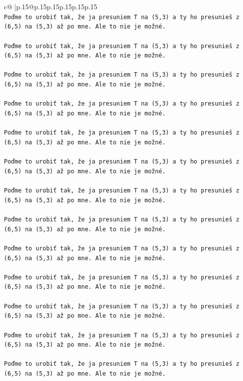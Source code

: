 \documentclass{article}
\begin{document}
{\begin{supertabular}{c@{$\;$}|p{.15\linewidth}@{}p{.15\linewidth}p{.15\linewidth}p{.15\linewidth}p{.15\linewidth}p{.15\linewidth}}
{{{\\ 
\texttt{Poďme to urobiť tak, že ja presuniem T na (5,3) a ty ho presunieš z (6,5) na (5,3) až po mne. Ale to nie je možné.} \\
\\ 
\texttt{Poďme to urobiť tak, že ja presuniem T na (5,3) a ty ho presunieš z (6,5) na (5,3) až po mne. Ale to nie je možné.} \\
\\ 
\texttt{Poďme to urobiť tak, že ja presuniem T na (5,3) a ty ho presunieš z (6,5) na (5,3) až po mne. Ale to nie je možné.} \\
\\ 
\texttt{Poďme to urobiť tak, že ja presuniem T na (5,3) a ty ho presunieš z (6,5) na (5,3) až po mne. Ale to nie je možné.} \\
\\ 
\texttt{Poďme to urobiť tak, že ja presuniem T na (5,3) a ty ho presunieš z (6,5) na (5,3) až po mne. Ale to nie je možné.} \\
\\ 
\texttt{Poďme to urobiť tak, že ja presuniem T na (5,3) a ty ho presunieš z (6,5) na (5,3) až po mne. Ale to nie je možné.} \\
\\ 
\texttt{Poďme to urobiť tak, že ja presuniem T na (5,3) a ty ho presunieš z (6,5) na (5,3) až po mne. Ale to nie je možné.} \\
\\ 
\texttt{Poďme to urobiť tak, že ja presuniem T na (5,3) a ty ho presunieš z (6,5) na (5,3) až po mne. Ale to nie je možné.} \\
\\ 
\texttt{Poďme to urobiť tak, že ja presuniem T na (5,3) a ty ho presunieš z (6,5) na (5,3) až po mne. Ale to nie je možné.} \\
\\ 
\texttt{Poďme to urobiť tak, že ja presuniem T na (5,3) a ty ho presunieš z (6,5) na (5,3) až po mne. Ale to nie je možné.} \\
\\ 
\texttt{Poďme to urobiť tak, že ja presuniem T na (5,3) a ty ho presunieš z (6,5) na (5,3) až po mne. Ale to nie je možné.} \\
\\ 
\texttt{Poďme to urobiť tak, že ja presuniem T na (5,3) a ty ho presunieš z (6,5) na (5,3) až po mne. Ale to nie je možné.} \\
\\ 
\texttt{Poďme to urobiť tak, že ja presuniem T na (5,3) a ty ho presunieš z (6,5) na (5,3) až po mne. Ale to nie je možné.} \\
}}}
\end{supertabular}}
\end{document}
